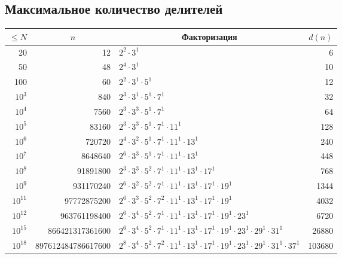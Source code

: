 \documentclass[10pt, portrait,letterpaper]{article}
\def\le{\leqslant}
\begin{document}
\begin{itemize}
    

\subsection {Максимальное количество делителей}
{
\newcommand\bn[1]{\multicolumn{1}{|c|}{#1}}
\newcommand\cn[1]{\multicolumn{1}{c|}{#1}}
\begin{center}
\begin{tabular}{|r|r|l|r|}
\hline
    \bn{$\le N$} & \cn{$n$} & \cn{Факторизация} & \cn{$d(n)$}
\\\hline
    20 & \num{12} & $2^2 \cdot 3^1$ & \num{6}
\\\hline
    50 & \num{48} & $2^4 \cdot 3^1$ & \num{10}
\\\hline
     100 & \num{60} & $2^2 \cdot 3^1 \cdot 5^1$ & \num{12}
\\\hline
    $10^3$ & \num{840} & $2^3 \cdot 3^1 \cdot 5^1 \cdot 7^1$ \strut & \num{32}
\\\hline
    $10^4$ & \num{7560} & $2^3 \cdot 3^3 \cdot 5^1 \cdot 7^1$ & \num{64}
\\\hline
    $10^5$ & \num{83160} & $2^3 \cdot 3^3 \cdot 5^1 \cdot 7^1 \cdot 11^1$ & \num{128}
\\\hline
    $10^6$ & \num{720720} & $2^4 \cdot 3^2 \cdot 5^1 \cdot 7^1 \cdot 11^1 \cdot 13^1$ & \num{240}
\\\hline
    $10^7$ & \num{8648640} & $2^6 \cdot 3^3 \cdot 5^1 \cdot 7^1 \cdot 11^1 \cdot 13^1$ & \num{448}
\\\hline
    $10^8$ & \num{91891800} & $2^3 \cdot 3^3 \cdot 5^2 \cdot 7^1 \cdot 11^1 \cdot 13^1 \cdot 17^1$ & \num{768}
\\\hline
    $10^9$ & \num{931170240} & $2^6 \cdot 3^2 \cdot 5^2 \cdot 7^1 \cdot 11^1 \cdot 13^1 \cdot 17^1 \cdot 19^1$ & \num{1344}
\\\hline
    $10^{11}$ & \num{97772875200} & $2^6 \cdot 3^3 \cdot 5^2 \cdot 7^2 \cdot 11^1 \cdot 13^1 \cdot 17^1 \cdot 19^1$ & \num{4032}
\\\hline
    $10^{12}$ & \num{963761198400} & $2^6 \cdot 3^4 \cdot 5^2 \cdot 7^1 \cdot 11^1 \cdot 13^1 \cdot 17^1 \cdot 19^1 \cdot 23^1$ & \num{6720}
\\\hline
    $10^{15}$ & \num{866421317361600} & $2^6 \cdot 3^4 \cdot 5^2 \cdot 7^1 \cdot 11^1 \cdot 13^1 \cdot 17^1 \cdot 19^1 \cdot 23^1 \cdot 29^1 \cdot 31^1$ & \num{26880}
\\\hline
    $10^{18}$ & \num{897612484786617600} & $2^8 \cdot 3^4 \cdot 5^2 \cdot 7^2 \cdot 11^1 \cdot 13^1 \cdot 17^1 \cdot 19^1 \cdot 23^1 \cdot 29^1 \cdot 31^1 \cdot 37^1$ & \num{103680}
\\\hline
\end{tabular}


\end{center}}
\end{itemize}
\end{document}

